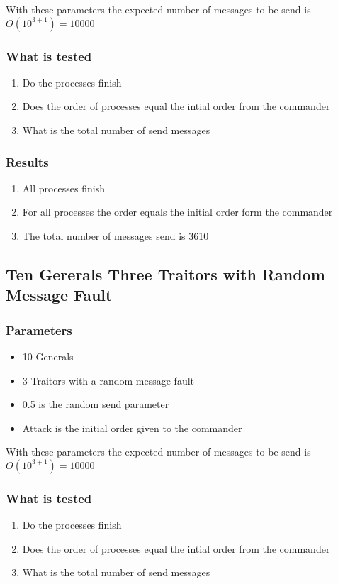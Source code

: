 \documentclass[a4paper, notitlepage]{article}
\begin{document}
With these parameters the expected number of messages to be send is \(O(10^{3+1}) = 10000\)

\subsubsection*{What is tested}
\begin{enumerate}
\item Do the processes finish
\item Does the order of processes equal the intial order from the commander
\item What is the total number of send messages
\end{enumerate}

\subsubsection*{Results}
\begin{enumerate}
\item All processes finish
\item For all processes the order equals the initial order form the commander
\item The total number of messages send is 3610
\end{enumerate}





\subsection{Ten Gererals Three Traitors with Random Message Fault}

\subsubsection*{Parameters}
\begin{itemize}
\item 10 Generals
\item 3 Traitors with a random message fault
\item 0.5 is the random send parameter
\item Attack is the initial order given to the commander
\end{itemize}

With these parameters the expected number of messages to be send is \(O(10^{3+1}) = 10000\)

\subsubsection*{What is tested}
\begin{enumerate}
\item Do the processes finish
\item Does the order of processes equal the intial order from the commander
\item What is the total number of send messages
\end{enumerate}
\end{document}
